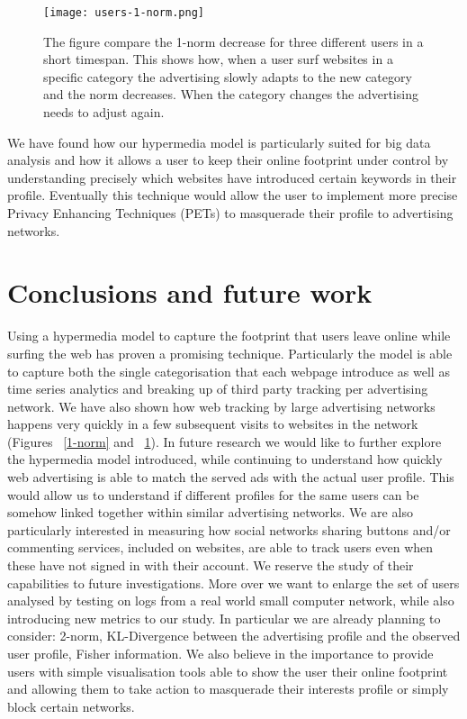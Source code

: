 \documentclass[runningheads,a4paper]{llncs}
\begin{document}
\begin{figure}[!ht]
\centering
\texttt{[image: users-1-norm.png]}
\caption{The figure compare the 1-norm decrease for three different users in a short timespan. This shows how, when a user surf websites in a specific category the advertising slowly adapts to the new category and the norm decreases. When the category changes the advertising needs to adjust again. 
\label{users-1-norm}}
\end{figure}

We have found how our hypermedia model is particularly suited for big data analysis and how it allows a user to keep their online footprint under control by understanding precisely which websites have introduced certain keywords in their profile. Eventually this technique would allow the user to implement more precise Privacy Enhancing Techniques (PETs) to masquerade their profile to advertising networks.

\section{Conclusions and future work}

Using a hypermedia model to capture the footprint that users leave online while surfing the web has proven a promising technique. Particularly the model is able to capture both the single categorisation that each webpage introduce as well as time series analytics and breaking up of third party tracking per advertising network. 
We have also shown how web tracking by large advertising networks happens very quickly in a few subsequent visits to websites in the network (Figures ~\ref{1-norm} and ~\ref{users-1-norm}).
In future research we would like to further explore the hypermedia model introduced, while continuing to understand how quickly web advertising is able to match the served ads with the actual user profile. This would allow us to understand if different profiles for the same users can be somehow linked together within similar advertising networks.
We are also particularly interested in measuring how social networks sharing buttons and/or commenting services, included on websites, are able to track users even when these have not signed in with their account. We reserve the study of their capabilities to future investigations.
More over we want to enlarge the set of users analysed by testing on logs from a real world small computer network, while also introducing new metrics to our study. In particular we are already planning to consider: 2-norm, KL-Divergence between the advertising profile and the observed user profile, Fisher information.
We also believe in the importance to provide users with simple visualisation tools able to show the user their online footprint and allowing them to take action to masquerade their interests profile or simply block certain networks.
\end{document}
